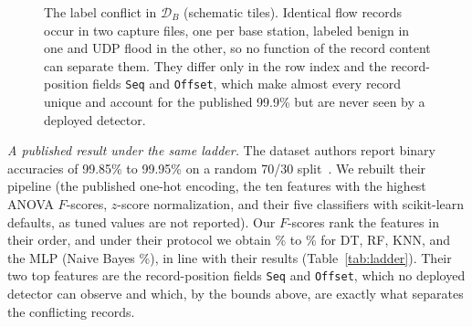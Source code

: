 \documentclass{ieeeaccess}
\newcommand{\DB}{\ensuremath{\mathcal{D}_{B}}}
\begin{document}
\begin{table}[t]
\caption{Label conflicts in \DB{} (5G-NIDD). Content: all fields of the published encoding except row index, \texttt{Seq}, \texttt{Offset}, and the labels. Ceiling: balanced accuracy of the best lookup on distinct records, in sample.}
\label{tab:conflict}
\centering
\scriptsize
\setlength{\tabcolsep}{3pt}

\end{table}
\begin{figure}[t]
\centering
\resizebox{\columnwidth}{!}{}
\caption{The label conflict in \DB{} (schematic tiles). Identical flow records occur in two capture files, one per base station, labeled benign in one and UDP flood in the other, so no function of the record content can separate them. They differ only in the row index and the record-position fields \texttt{Seq} and \texttt{Offset}, which make almost every record unique and account for the published 99.9\% but are never seen by a deployed detector.}
\label{fig:conflict}
\end{figure}
\begin{table}[t]
\caption{References inside \DB{}: balanced accuracy of models trained and tested on \DB{} only, mean over $n$ splits, each with a 240,000-flow training sample. $^{\ast}$Range over the six architectures on the test flows without the benign copies of Table~\ref{tab:conflict}. Capture-file splits hold out four of the 20 files.}
\label{tab:target_ref}
\centering
\footnotesize

\end{table}
\emph{A published result under the same ladder.} The dataset authors report binary accuracies of 99.85\% to 99.95\% on a random 70/30 split~\cite{samarakoon2022niddarxiv}. We rebuilt their pipeline (the published one-hot encoding, the ten features with the highest ANOVA $F$-scores, $z$-score normalization, and their five classifiers with scikit-learn defaults, as tuned values are not reported). Our $F$-scores rank the features in their order, and under their protocol we obtain \PubRzAccMin\% to \PubRzAccMax\% for DT, RF, KNN, and the MLP (Naive Bayes \PubRzAccNB\%), in line with their results (Table~\ref{tab:ladder}). Their two top features are the record-position fields \texttt{Seq} and \texttt{Offset}, which no deployed detector can observe and which, by the bounds above, are exactly what separates the conflicting records.
\end{document}
